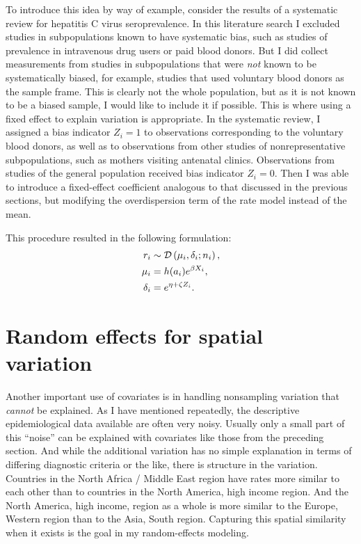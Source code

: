 To introduce this idea by way of example, consider the results of a
systematic review for hepatitis C virus seroprevalence.  In this
literature search I excluded studies in subpopulations known to have
systematic bias, such as studies of prevalence in intravenous drug
users or paid blood donors.  But I did collect measurements from
studies in subpopulations that were \emph{not} known to be
systematically biased, for example, studies that used voluntary blood
donors as the sample frame.  This is clearly not the whole population,
but as it is not known to be a biased sample, I would like to include
it if possible.  This is where using a fixed effect to explain
variation is appropriate. In the systematic review, I assigned
a bias indicator $Z_i = 1$ to observations corresponding to
the voluntary blood donors, as well as to observations from other studies of nonrepresentative
subpopulations, such as mothers visiting antenatal clinics.
Observations from studies of the general
population received bias indicator $Z_i = 0$.  Then I was able to
introduce a fixed-effect coefficient analogous to that discussed in the previous sections,
but modifying the overdispersion term of the rate model instead of
the mean.

This procedure resulted in the following
formulation:
\begin{align*}
r_i &\sim \mathcal{D}\left(\mu_i, \delta_i; n_i\right),\\
\mu_i &= h(a_i)e^{\beta X_i},\\
\delta_i &= e^{\eta + \zeta Z_i}.
\end{align*}

\section{Random effects for spatial variation}
Another important use of covariates is in handling nonsampling
variation that \emph{cannot} be explained. As I have mentioned
repeatedly, the descriptive epidemiological data available are often
very noisy.  Usually only a small part of this ``noise''
can be explained with covariates like those from the preceding
section. And while the additional variation has no simple explanation
in terms of differing diagnostic criteria or the like, there is
structure in the variation. Countries in the North Africa / Middle East
region have rates more similar to each other than to countries in the
North America, high income region.  And the North America, high income,
region as a whole is more similar to the Europe, Western region than
to the Asia, South region.  Capturing this spatial similarity when it
exists is the goal in my random-effects modeling.

